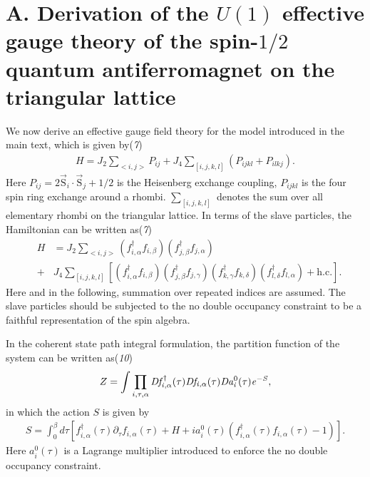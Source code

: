 \documentclass[12pt]{article}
\begin{document}
\section*{A. Derivation of the $U(1)$ effective gauge theory of the spin-$1/2$ quantum antiferromagnet on the triangular lattice}
We now derive an effective gauge field theory for the model introduced in the main text, which is given by({\it 7\/})
\begin{eqnarray}
H=J_{2}\sum_{<i,j>} P_{ij}+J_{4}\sum_{[i,j,k,l]}(P_{ijkl}+P_{ilkj}).\nonumber
\end{eqnarray}
Here $P_{ij}=2\vec{\mathrm{S}}_{i}\cdot\vec{\mathrm{S}}_{j}+1/2$ is the Heisenberg exchange coupling, $P_{ijkl}$ is the four spin ring exchange around a rhombi. $\sum_{[i,j,k,l]}$ denotes the sum over all elementary rhombi on the triangular lattice. In terms of the slave particles, the Hamiltonian can be written as({\it 7\/})
\begin{eqnarray}
&H&=J_{2}\sum_{<i,j>} (f^{\dagger}_{i,\alpha}f_{i,\beta})(f^{\dagger}_{j,\beta}f_{j,\alpha})\nonumber\\
&+&J_{4}\sum_{[i,j,k,l]}[(f^{\dagger}_{i,\alpha}f_{i,\beta})(f^{\dagger}_{j,\beta}f_{j,\gamma})(f^{\dagger}_{k,\gamma}f_{k,\delta})(f^{\dagger}_{l,\delta}f_{l,\alpha})+\mathrm{h.c.}]\nonumber.
\end{eqnarray}
Here and in the following, summation over repeated indices are assumed.  The slave particles should be subjected to the no double occupancy constraint to be a faithful representation of the spin algebra. 

In the coherent state path integral formulation, the partition function of the system can be written as({\it 10\/})
\begin{eqnarray}
 Z= \int \prod_{i,\tau,\alpha} \it{D}f^{\dagger}_{i,\alpha}(\tau)\it{D}f_{i,\alpha}(\tau)\it{D}a^{\mathrm{0}}_{i}(\tau)e^{-S},\nonumber
 \end{eqnarray}
 in which the action $S$ is given by
 \begin{eqnarray}
S=\int_{0}^{\beta} d\tau   [f^{\dagger}_{i,\alpha}(\tau)\partial_{\tau} f_{i,\alpha}(\tau)+H+ia^{0}_{i}(\tau)(f^{\dagger}_{i,\alpha}(\tau)f_{i,\alpha}(\tau)-1)]. \nonumber
 \end{eqnarray}  
 Here $a^{0}_{i}(\tau)$ is a Lagrange multiplier introduced to enforce the no double occupancy constraint. 
 
\end{document}
